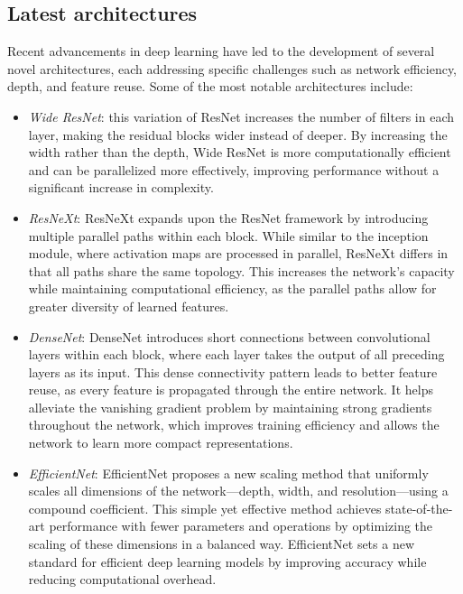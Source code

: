\subsection{Latest architectures}
Recent advancements in deep learning have led to the development of several novel architectures, each addressing specific challenges such as network efficiency, depth, and feature reuse. 
Some of the most notable architectures include:
\begin{itemize}
    \item \textit{Wide ResNet}: this variation of ResNet increases the number of filters in each layer, making the residual blocks wider instead of deeper. 
        By increasing the width rather than the depth, Wide ResNet is more computationally efficient and can be parallelized more effectively, improving performance without a significant increase in complexity.
    \item \textit{ResNeXt}: ResNeXt expands upon the ResNet framework by introducing multiple parallel paths within each block. 
        While similar to the inception module, where activation maps are processed in parallel, ResNeXt differs in that all paths share the same topology. 
        This increases the network's capacity while maintaining computational efficiency, as the parallel paths allow for greater diversity of learned features.
    \item \textit{DenseNet}: DenseNet introduces short connections between convolutional layers within each block, where each layer takes the output of all preceding layers as its input. 
        This dense connectivity pattern leads to better feature reuse, as every feature is propagated through the entire network. 
        It helps alleviate the vanishing gradient problem by maintaining strong gradients throughout the network, which improves training efficiency and allows the network to learn more compact representations.
    \item \textit{EfficientNet}: EfficientNet proposes a new scaling method that uniformly scales all dimensions of the network—depth, width, and resolution—using a compound coefficient. 
        This simple yet effective method achieves state-of-the-art performance with fewer parameters and operations by optimizing the scaling of these dimensions in a balanced way. 
        EfficientNet sets a new standard for efficient deep learning models by improving accuracy while reducing computational overhead.
\end{itemize}